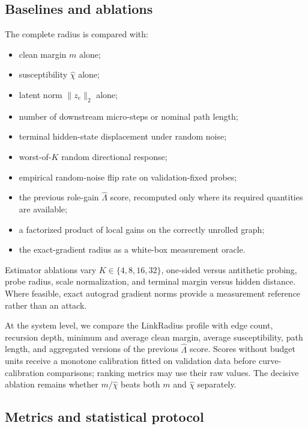\documentclass[11pt]{article}
\begin{document}
\subsection{Baselines and ablations}

The complete radius is compared with:
\begin{itemize}
    \item clean margin $m$ alone;
    \item susceptibility $\widehat\chi$ alone;
    \item latent norm $\|z_e\|_2$ alone;
    \item number of downstream micro-steps or nominal path length;
    \item terminal hidden-state displacement under random noise;
    \item worst-of-$K$ random directional response;
    \item empirical random-noise flip rate on validation-fixed probes;
    \item the previous role-gain $\widehat\Lambda$ score, recomputed only where
    its required quantities are available;
    \item a factorized product of local gains on the correctly unrolled graph;
    \item the exact-gradient radius as a white-box measurement oracle.
\end{itemize}
Estimator ablations vary $K\in\{4,8,16,32\}$, one-sided versus antithetic
probing, probe radius, scale normalization, and terminal margin versus hidden
distance. Where feasible, exact autograd gradient norms provide a measurement
reference rather than an attack.

At the system level, we compare the LinkRadius profile with edge count,
recursion depth, minimum and average clean margin, average susceptibility,
path length, and aggregated versions of the previous \(\widehat\Lambda\)
score. Scores without budget units receive a monotone calibration fitted on
validation data before curve-calibration comparisons; ranking metrics may use
their raw values. The decisive ablation remains whether \(m/\widehat\chi\)
beats both \(m\) and \(\widehat\chi\) separately.

\subsection{Metrics and statistical protocol}
\end{document}
